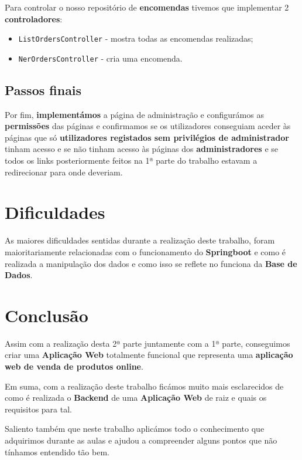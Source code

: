 \documentclass[11pt]{article}   %
\begin{document}
Para controlar o nosso repositório de \textbf{encomendas} tivemos que implementar 2 \textbf{controladores}:
\begin{itemize}
    \item \verb|ListOrdersController| - mostra todas as encomendas realizadas;
    \item \verb|NerOrdersController| - cria uma encomenda.
\end{itemize}

\subsection{Passos finais}

Por fim, \textbf{implementámos} a página de administração e configurámos as \textbf{permissões} das páginas e 
confirmamos se os utilizadores conseguiam aceder às páginas que só \textbf{utilizadores registados
sem privilégios de administrador} tinham acesso e se não tinham acesso às páginas dos \textbf{administradores} 
e se todos os links posteriormente feitos na 1ª parte do trabalho estavam a redirecionar para onde deveriam.

\section{Dificuldades}

As maiores dificuldades sentidas durante a realização deste trabalho, foram maioritariamente
relacionadas com o funcionamento do \textbf{Springboot} e como é realizada a manipulação dos
dados e como isso se reflete no funciona da \textbf{Base de Dados}.

\section{Conclusão} %

\hspace{0,5cm}Assim com a realização desta 2ª parte juntamente com a 1ª parte, conseguimos criar 
uma \textbf{Aplicação Web} totalmente funcional que representa uma \textbf{aplicação web 
de venda de produtos online}.

Em suma, com a realização deste trabalho ficámos muito mais esclarecidos de como é
realizada o \textbf{Backend} de uma \textbf{Aplicação Web} de raiz e quais os requisitos para tal.\par
Saliento também que neste trabalho aplicámos todo o conhecimento que adquirimos durante as aulas e
ajudou a compreender alguns pontos que não tínhamos entendido tão bem.
\end{document}

